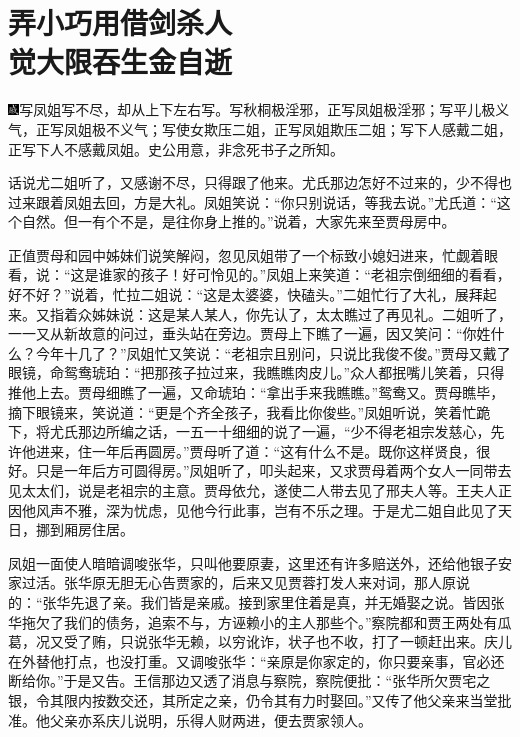 
\chapter{弄小巧用借剑杀人\\觉大限吞生金自逝}
{\includegraphics[width=3mm]{../Images/00005}\kaishu      写凤姐写不尽，却从上下左右写。写秋桐极淫邪，正写凤姐极淫邪；写平儿极义气，正写凤姐极不义气；写使女欺压二姐，正写凤姐欺压二姐；写下人感戴二姐，正写下人不感戴凤姐。史公用意，非念死书子之所知。}

话说尤二姐听了，又感谢不尽，只得跟了他来。尤氏那边怎好不过来的，少不得也过来跟着凤姐去回，方是大礼。凤姐笑说：``你只别说话，等我去说。''尤氏道：``这个自然。但一有个不是，是往你身上推的。''说着，大家先来至贾母房中。

正值贾母和园中姊妹们说笑解闷，忽见凤姐带了一个标致小媳妇进来，忙觑着眼看，说：``这是谁家的孩子！好可怜见的。''凤姐上来笑道：``老祖宗倒细细的看看，好不好？''说着，忙拉二姐说：``这是太婆婆，快磕头。''二姐忙行了大礼，展拜起来。又指着众姊妹说：这是某人某人，你先认了，太太瞧过了再见礼。二姐听了，一一又从新故意的问过，垂头站在旁边。贾母上下瞧了一遍，因又笑问：``你姓什么？今年十几了？''凤姐忙又笑说：``老祖宗且别问，只说比我俊不俊。''贾母又戴了眼镜，命鸳鸯琥珀：``把那孩子拉过来，我瞧瞧肉皮儿。''众人都抿嘴儿笑着，只得推他上去。贾母细瞧了一遍，又命琥珀：``拿出手来我瞧瞧。''鸳鸯又。贾母瞧毕，摘下眼镜来，笑说道：``更是个齐全孩子，我看比你俊些。''凤姐听说，笑着忙跪下，将尤氏那边所编之话，一五一十细细的说了一遍，``少不得老祖宗发慈心，先许他进来，住一年后再圆房。''贾母听了道：``这有什么不是。既你这样贤良，很好。只是一年后方可圆得房。''凤姐听了，叩头起来，又求贾母着两个女人一同带去见太太们，说是老祖宗的主意。贾母依允，遂使二人带去见了邢夫人等。王夫人正因他风声不雅，深为忧虑，见他今行此事，岂有不乐之理。于是尤二姐自此见了天日，挪到厢房住居。

凤姐一面使人暗暗调唆张华，只叫他要原妻，这里还有许多赔送外，还给他银子安家过活。张华原无胆无心告贾家的，后来又见贾蓉打发人来对词，那人原说的：``张华先退了亲。我们皆是亲戚。接到家里住着是真，并无婚娶之说。皆因张华拖欠了我们的债务，追索不与，方诬赖小的主人那些个。''察院都和贾王两处有瓜葛，况又受了贿，只说张华无赖，以穷讹诈，状子也不收，打了一顿赶出来。庆儿在外替他打点，也没打重。又调唆张华：``亲原是你家定的，你只要亲事，官必还断给你。''于是又告。王信那边又透了消息与察院，察院便批：``张华所欠贾宅之银，令其限内按数交还，其所定之亲，仍令其有力时娶回。''又传了他父亲来当堂批准。他父亲亦系庆儿说明，乐得人财两进，便去贾家领人。


